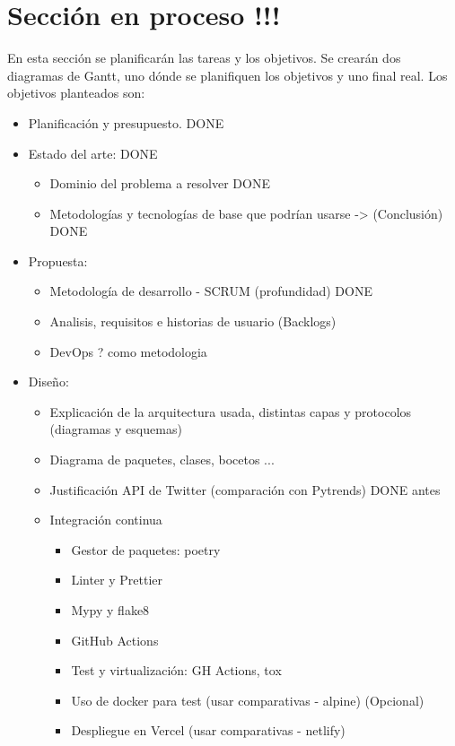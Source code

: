 \section{Sección en proceso !!!}
En esta sección se planificarán las tareas y los objetivos. Se crearán dos diagramas de Gantt, uno dónde se planifiquen los objetivos y uno final real. Los objetivos planteados son:
\begin{itemize}
\item Planificación y presupuesto.  DONE
\item Estado del arte:  DONE
\begin{itemize}
    \item Dominio del problema a resolver   DONE
    \item Metodologías y tecnologías de base que podrían usarse -> (Conclusión) DONE
\end{itemize}
\item Propuesta:
\begin{itemize}
    \item Metodología de desarrollo - SCRUM (profundidad) DONE
    \item Analisis, requisitos e historias de usuario (Backlogs)
    \item DevOps ? como metodologia
\end{itemize}
\item Diseño:
\begin{itemize}
    \item Explicación de la arquitectura usada, distintas capas y protocolos (diagramas y esquemas)
    \item Diagrama de paquetes, clases, bocetos ...
    \item Justificación API de Twitter (comparación con Pytrends) DONE antes
    \item Integración continua
    \begin{itemize}
        \item Gestor de paquetes: poetry
        \item Linter y Prettier
        \item Mypy y flake8
        \item GitHub Actions
        \item Test y virtualización: GH Actions, tox
        \item Uso de docker para test (usar comparativas - alpine) (Opcional)
        \item Despliegue en Vercel (usar comparativas - netlify)
    \end{itemize}

\end{itemize}
\end{itemize}
